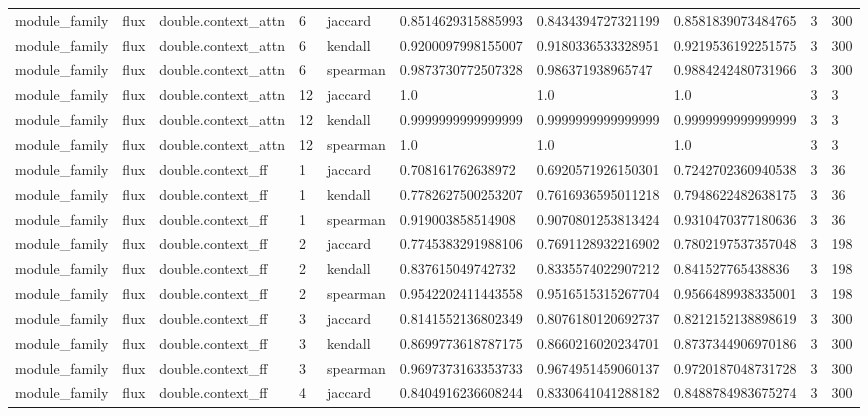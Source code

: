 \begin{tabular}{llllllllll}
module\_family & flux & double.context\_attn & 6 & jaccard & 0.8514629315885993 & 0.8434394727321199 & 0.8581839073484765 & 3 & 300 \\
module\_family & flux & double.context\_attn & 6 & kendall & 0.9200097998155007 & 0.9180336533328951 & 0.9219536192251575 & 3 & 300 \\
module\_family & flux & double.context\_attn & 6 & spearman & 0.9873730772507328 & 0.986371938965747 & 0.9884242480731966 & 3 & 300 \\
module\_family & flux & double.context\_attn & 12 & jaccard & 1.0 & 1.0 & 1.0 & 3 & 3 \\
module\_family & flux & double.context\_attn & 12 & kendall & 0.9999999999999999 & 0.9999999999999999 & 0.9999999999999999 & 3 & 3 \\
module\_family & flux & double.context\_attn & 12 & spearman & 1.0 & 1.0 & 1.0 & 3 & 3 \\
module\_family & flux & double.context\_ff & 1 & jaccard & 0.708161762638972 & 0.6920571926150301 & 0.7242702360940538 & 3 & 36 \\
module\_family & flux & double.context\_ff & 1 & kendall & 0.7782627500253207 & 0.7616936595011218 & 0.7948622482638175 & 3 & 36 \\
module\_family & flux & double.context\_ff & 1 & spearman & 0.919003858514908 & 0.9070801253813424 & 0.9310470377180636 & 3 & 36 \\
module\_family & flux & double.context\_ff & 2 & jaccard & 0.7745383291988106 & 0.7691128932216902 & 0.7802197537357048 & 3 & 198 \\
module\_family & flux & double.context\_ff & 2 & kendall & 0.837615049742732 & 0.8335574022907212 & 0.841527765438836 & 3 & 198 \\
module\_family & flux & double.context\_ff & 2 & spearman & 0.9542202411443558 & 0.9516515315267704 & 0.9566489938335001 & 3 & 198 \\
module\_family & flux & double.context\_ff & 3 & jaccard & 0.8141552136802349 & 0.8076180120692737 & 0.8212152138898619 & 3 & 300 \\
module\_family & flux & double.context\_ff & 3 & kendall & 0.8699773618787175 & 0.8660216020234701 & 0.8737344906970186 & 3 & 300 \\
module\_family & flux & double.context\_ff & 3 & spearman & 0.9697373163353733 & 0.9674951459060137 & 0.9720187048731728 & 3 & 300 \\
module\_family & flux & double.context\_ff & 4 & jaccard & 0.8404916236608244 & 0.8330641041288182 & 0.8488784983675274 & 3 & 300 \\

\end{tabular}
